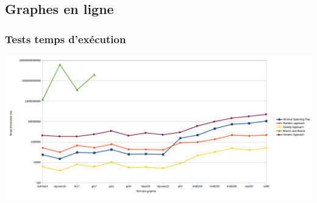 \documentclass[10pt,a4paper]{report}
\begin{document}
	\subsection{Graphes en ligne}
		\subsubsection{Tests temps d'exécution}
			\includegraphics[scale=0.45]{./Ressource/temps_graphes_site.png}
		
	
\end{document}

